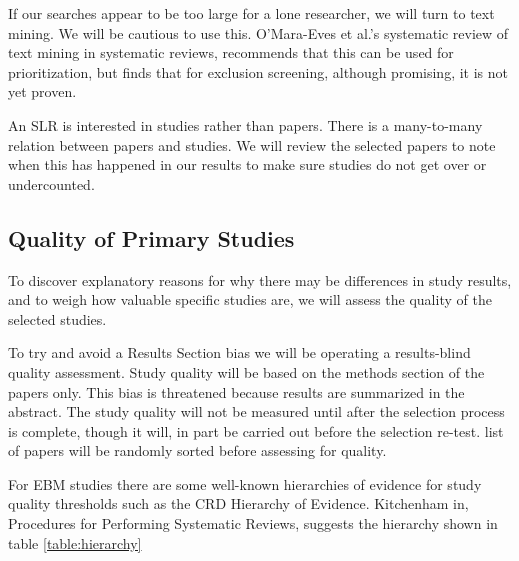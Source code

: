 If our searches appear to be too large for a lone researcher, we will turn to text mining.
We will be cautious to use this.
O'Mara-Eves et al.'s systematic review of text mining in systematic reviews\cite{OMara-Eves_2015}, recommends that this can be used for prioritization, but finds that for exclusion screening, although promising, it is not yet proven.

An SLR is interested in studies rather than papers.
There is a many-to-many relation between papers and studies.
We will review the selected papers to note when this has happened in our results to make sure studies do not get over or undercounted.

\subsection{Quality of Primary Studies}
To discover explanatory reasons for why there may be differences in study results, and to weigh how valuable specific studies are, we will assess the quality of the selected studies.

To try and avoid a Results Section bias we will be operating a results-blind quality assessment.
Study quality will be based on the methods section of the papers only.
This bias is threatened because results are summarized in the abstract.
The study quality will not be measured until after the selection process is complete, though it will, in part be carried out before the selection re-test.
list of papers will be randomly sorted before assessing for quality.

For EBM studies there are some well-known hierarchies of evidence for study quality thresholds such as the CRD Hierarchy of Evidence\cite{Cochrane_2019}.
Kitchenham in, Procedures for Performing Systematic Reviews\cite{Kitchenham_2004_2}, suggests the hierarchy shown in table \ref{table:hierarchy}

